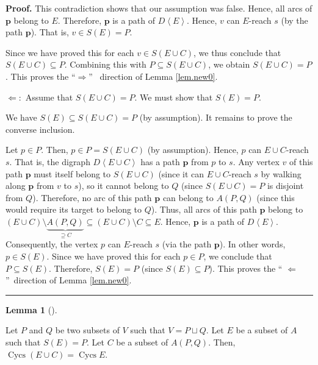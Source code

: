 \documentclass[numbers=enddot,12pt,final,onecolumn,notitlepage]{scrartcl}%
\theoremstyle{definition}
\newtheorem{lem}[theo]{Lemma}
\newenvironment{lemma}[1][]
{\begin{lem}[#1]\begin{leftbar}}
{\end{leftbar}\end{lem}}
\newenvironment{proof}[1][Proof]{\noindent\textbf{#1.} }{\ \rule{0.5em}{0.5em}}
\theoremstyle{plainsl}
\begin{document}
\begin{proof}
This contradiction shows that our assumption was false. Hence, all arcs of
$\mathbf{p}$ belong to $E$. Therefore, $\mathbf{p}$ is a path of
$D\left\langle E\right\rangle $. Hence, $v$ can $E$-reach $s$ (by the path
$\mathbf{p}$). That is, $v\in S\left(  E\right)  =P$.

Since we have proved this for each $v\in S\left(  E\cup C\right)  $, we thus
conclude that $S\left(  E\cup C\right)  \subseteq P$. Combining this with
$P\subseteq S\left(  E\cup C\right)  $, we obtain $S\left(  E\cup C\right)
=P$. This proves the \textquotedblleft$\Longrightarrow$\textquotedblright%
\ direction of Lemma \ref{lem.new0}. \medskip

$\Longleftarrow:$ Assume that $S\left(  E\cup C\right)  =P$. We must show that
$S\left(  E\right)  =P$.

We have $S\left(  E\right)  \subseteq S\left(  E\cup C\right)  =P$ (by
assumption). It remains to prove the converse inclusion.

Let $p\in P$. Then, $p\in P=S\left(  E\cup C\right)  $ (by assumption). Hence,
$p$ can $E\cup C$-reach $s$. That is, the digraph $D\left\langle E\cup
C\right\rangle $ has a path $\mathbf{p}$ from $p$ to $s$. Any vertex $v$ of
this path $\mathbf{p}$ must itself belong to $S\left(  E\cup C\right)  $
(since it can $E\cup C$-reach $s$ by walking along $\mathbf{p}$ from $v$ to
$s$), so it cannot belong to $Q$ (since $S\left(  E\cup C\right)  =P$ is
disjoint from $Q$). Therefore, no arc of this path $\mathbf{p}$ can belong to
$A\left(  P,Q\right)  $ (since this would require its target to belong to
$Q$). Thus, all arcs of this path $\mathbf{p}$ belong to $\left(  E\cup
C\right)  \setminus\underbrace{A\left(  P,Q\right)  }_{\supseteq C}%
\subseteq\left(  E\cup C\right)  \setminus C\subseteq E$. Hence, $\mathbf{p}$
is a path of $D\left\langle E\right\rangle $. Consequently, the vertex $p$ can
$E$-reach $s$ (via the path $\mathbf{p}$). In other words, $p\in S\left(
E\right)  $. Since we have proved this for each $p\in P$, we conclude that
$P\subseteq S\left(  E\right)  $. Therefore, $S\left(  E\right)  =P$ (since
$S\left(  E\right)  \subseteq P$). This proves the \textquotedblleft%
$\Longleftarrow$\textquotedblright\ direction of Lemma \ref{lem.new0}.
\end{proof}

\begin{lemma}
\label{lem.newC}Let $P$ and $Q$ be two subsets of $V$ such that $V=P\sqcup Q$.
Let $E$ be a subset of $A$ such that $S\left(  E\right)  =P$. Let $C$ be a
subset of $A\left(  P,Q\right)  $. Then, $\operatorname*{Cycs}\left(  E\cup
C\right)  =\operatorname*{Cycs}E$.
\end{lemma}
\end{document}
